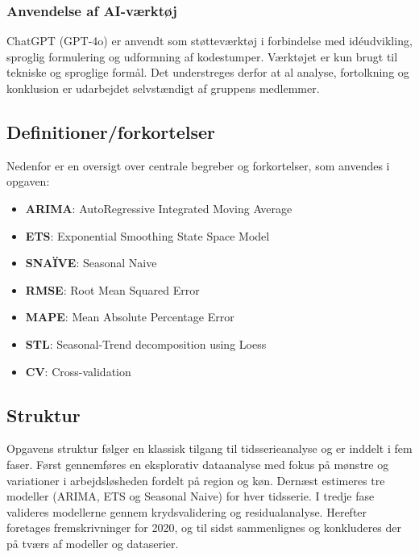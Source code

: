 \documentclass[
]{article}
\providecommand{\tightlist}{%
  \setlength{\itemsep}{0pt}\setlength{\parskip}{0pt}}\usepackage{longtable,booktabs,array}
\begin{document}
\subsubsection{Anvendelse af
AI-værktøj}\label{anvendelse-af-ai-vuxe6rktuxf8j}

ChatGPT (GPT-4o) er anvendt som støtteværktøj i forbindelse med
idéudvikling, sproglig formulering og udformning af kodestumper.
Værktøjet er kun brugt til tekniske og sproglige formål. Det
understreges derfor at al analyse, fortolkning og konklusion er
udarbejdet selvstændigt af gruppens medlemmer.

\subsection{Definitioner/forkortelser}\label{definitionerforkortelser}

Nedenfor er en oversigt over centrale begreber og forkortelser, som
anvendes i opgaven:

\begin{itemize}
\tightlist
\item
  \textbf{ARIMA}: AutoRegressive Integrated Moving Average
\item
  \textbf{ETS}: Exponential Smoothing State Space Model
\item
  \textbf{SNAÏVE}: Seasonal Naive
\item
  \textbf{RMSE}: Root Mean Squared Error
\item
  \textbf{MAPE}: Mean Absolute Percentage Error
\item
  \textbf{STL}: Seasonal-Trend decomposition using Loess
\item
  \textbf{CV}: Cross-validation
\end{itemize}

\subsection{Struktur}\label{struktur}

Opgavens struktur følger en klassisk tilgang til tidsserieanalyse og er
inddelt i fem faser. Først gennemføres en eksplorativ dataanalyse med
fokus på mønstre og variationer i arbejdsløsheden fordelt på region og
køn. Dernæst estimeres tre modeller (ARIMA, ETS og Seasonal Naive) for
hver tidsserie. I tredje fase valideres modellerne gennem
krydsvalidering og residualanalyse. Herefter foretages fremskrivninger
for 2020, og til sidst sammenlignes og konkluderes der på tværs af
modeller og dataserier.
\end{document}
